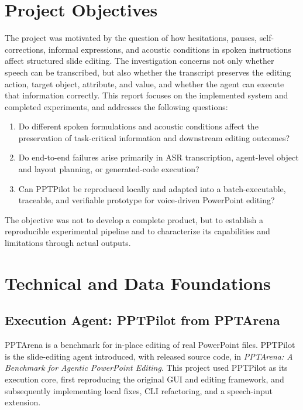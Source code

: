 \documentclass[11pt,a4paper,UTF8,fontset=fandol]{ctexart}
\begin{document}
\newpage

\section{Project Objectives}

The project was motivated by the question of how hesitations, pauses, self-corrections, informal expressions, and acoustic conditions in spoken instructions affect structured slide editing. The investigation concerns not only whether speech can be transcribed, but also whether the transcript preserves the editing action, target object, attribute, and value, and whether the agent can execute that information correctly. This report focuses on the implemented system and completed experiments, and addresses the following questions:

\begin{enumerate}
  \item Do different spoken formulations and acoustic conditions affect the preservation of task-critical information and downstream editing outcomes?
  \item Do end-to-end failures arise primarily in ASR transcription, agent-level object and layout planning, or generated-code execution?
  \item Can PPTPilot be reproduced locally and adapted into a batch-executable, traceable, and verifiable prototype for voice-driven PowerPoint editing?
\end{enumerate}

The objective was not to develop a complete product, but to establish a reproducible experimental pipeline and to characterize its capabilities and limitations through actual outputs.

\section{Technical and Data Foundations}

\subsection{Execution Agent: PPTPilot from PPTArena}

PPTArena is a benchmark for in-place editing of real PowerPoint files. PPTPilot is the slide-editing agent introduced, with released source code, in \textit{PPTArena: A Benchmark for Agentic PowerPoint Editing}. This project used PPTPilot as its execution core, first reproducing the original GUI and editing framework, and subsequently implementing local fixes, CLI refactoring, and a speech-input extension.
\end{document}
